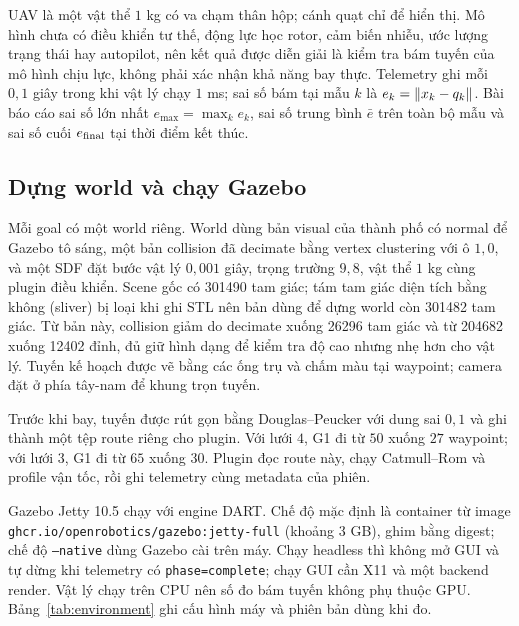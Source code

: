 UAV là một vật thể $1$ kg có va chạm thân hộp; cánh quạt chỉ để hiển thị. Mô hình
chưa có điều khiển tư thế, động lực học rotor, cảm biến nhiễu, ước lượng trạng thái
hay autopilot, nên kết quả được diễn giải là kiểm tra bám tuyến của mô hình chịu
lực, không phải xác nhận khả năng bay thực. Telemetry ghi mỗi $0{,}1$ giây trong
khi vật lý chạy $1$ ms; sai số bám tại mẫu $k$ là $e_k=\left\lVert x_k-q_k \right\rVert$. Bài báo
cáo sai số lớn nhất $e_{\max}=\max_k e_k$, sai số trung bình $\bar e$ trên toàn bộ
mẫu và sai số cuối $e_{\rm final}$ tại thời điểm kết thúc.

\subsection{Dựng world và chạy Gazebo}\label{sec:stage-simulate}

Mỗi goal có một world riêng. World dùng bản visual của thành phố có normal để
Gazebo tô sáng, một bản collision đã decimate bằng vertex clustering với ô
$1{,}0$, và một SDF đặt bước vật lý $0{,}001$ giây, trọng trường $9{,}8$, vật thể
$1$ kg cùng plugin điều khiển. Scene gốc có \num{301490} tam giác; tám tam giác
diện tích bằng không (sliver) bị loại khi ghi STL nên bản dùng để dựng world còn
\num{301482} tam giác. Từ bản này, collision giảm do decimate xuống \num{26296}
tam giác và từ \num{204682} xuống \num{12402} đỉnh, đủ giữ hình dạng để kiểm tra
độ cao nhưng nhẹ hơn cho vật lý. Tuyến kế hoạch
được vẽ bằng các ống trụ và chấm màu tại waypoint; camera đặt ở phía tây-nam để
khung trọn tuyến.

Trước khi bay, tuyến được rút gọn bằng Douglas--Peucker với dung sai $0{,}1$ và
ghi thành một tệp route riêng cho plugin. Với lưới $4$, G1 đi từ $50$ xuống $27$
waypoint; với lưới $3$, G1 đi từ $65$ xuống $30$. Plugin đọc route này, chạy
Catmull--Rom và profile vận tốc, rồi ghi telemetry cùng metadata của phiên.

Gazebo Jetty 10.5 \cite{gazebo} chạy với engine DART. Chế độ mặc định là container
từ image \texttt{ghcr.io/openrobotics/gazebo:jetty-full} (khoảng 3 GB), ghim bằng
digest; chế độ \texttt{--native} dùng Gazebo cài trên máy. Chạy headless thì không
mở GUI và tự dừng khi telemetry có \texttt{phase=complete}; chạy GUI cần X11 và
một backend render. Vật lý chạy trên CPU nên số đo bám tuyến không phụ thuộc GPU.
Bảng~\ref{tab:environment} ghi cấu hình máy và phiên bản dùng khi đo.


